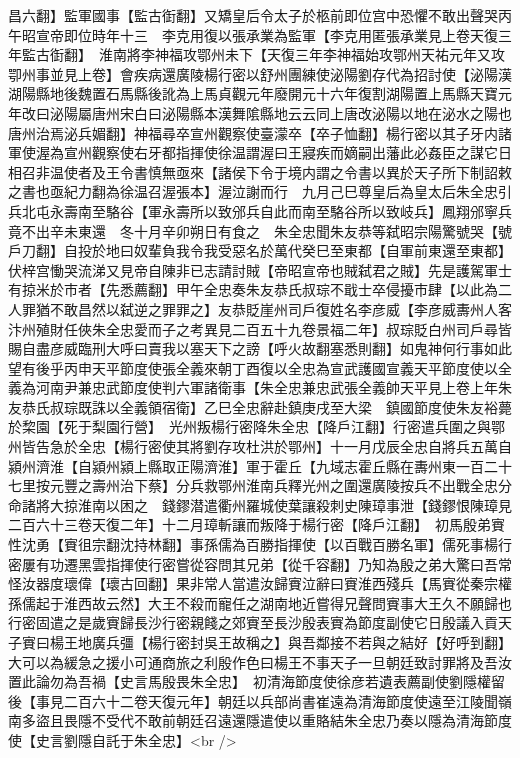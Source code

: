 昌六翻】監軍國事【監古衘翻】又矯皇后令太子於柩前即位宫中恐懼不敢出聲哭丙午昭宣帝即位時年十三　李克用復以張承業為監軍【李克用匿張承業見上卷天復三年監古衘翻】　淮南將李神福攻鄂州未下【天復三年李神福始攻鄂州天祐元年又攻卾州事並見上卷】會疾病還廣陵楊行密以舒州團練使泌陽劉存代為招討使【泌陽漢湖陽縣地後魏置石馬縣後訛為上馬貞觀元年廢開元十六年復割湖陽置上馬縣天寶元年改曰泌陽屬唐州宋白曰泌陽縣本漢舞隂縣地云云同上唐改泌陽以地在泌水之陽也唐州治焉泌兵媚翻】神福尋卒宣州觀察使臺濛卒【卒子恤翻】楊行密以其子牙内諸軍使渥為宣州觀察使右牙都指揮使徐温謂渥曰王寢疾而嫡嗣出藩此必姦臣之謀它日相召非温使者及王令書慎無亟來【諸侯下令于境内謂之令書以異於天子所下制詔敕之書也亟紀力翻為徐温召渥張本】渥泣謝而行　九月己巳尊皇后為皇太后朱全忠引兵北屯永壽南至駱谷【軍永壽所以致邠兵自此而南至駱谷所以致岐兵】鳳翔邠寧兵竟不出辛未東還　冬十月辛卯朔日有食之　朱全忠聞朱友恭等弑昭宗陽驚號哭【號戶刀翻】自投於地曰奴輩負我令我受惡名於萬代癸巳至東都【自軍前東還至東都】伏梓宫慟哭流涕又見帝自陳非已志請討賊【帝昭宣帝也賊弑君之賊】先是護駕軍士有掠米於市者【先悉薦翻】甲午全忠奏朱友恭氏叔琮不戢士卒侵擾市肆【以此為二人罪猶不敢昌然以弑逆之罪罪之】友恭貶崖州司戶復姓名李彦威【李彦威夀州人客汴州殖財任俠朱全忠愛而子之考異見二百五十九卷景福二年】叔琮貶白州司戶尋皆賜自盡彦威臨刑大呼曰賣我以塞天下之謗【呼火故翻塞悉則翻】如鬼神何行事如此望有後乎丙申天平節度使張全義來朝丁酉復以全忠為宣武護國宣義天平節度使以全義為河南尹兼忠武節度使判六軍諸衛事【朱全忠兼忠武張全義帥天平見上卷上年朱友恭氏叔琮既誅以全義領宿衛】乙巳全忠辭赴鎮庚戌至大梁　鎮國節度使朱友裕薨於棃園【死于梨園行營】　光州叛楊行密降朱全忠【降戶江翻】行密遣兵圍之與鄂州皆告急於全忠【楊行密使其將劉存攻杜洪於鄂州】十一月戊辰全忠自將兵五萬自潁州濟淮【自潁州潁上縣取正陽濟淮】軍于霍丘【九域志霍丘縣在夀州東一百二十七里按元豐之壽州治下蔡】分兵救鄂州淮南兵釋光州之圍還廣陵按兵不出戰全忠分命諸將大掠淮南以困之　錢鏐潜遣衢州羅城使葉讓殺刺史陳璋事泄【錢鏐恨陳璋見二百六十三卷天復二年】十二月璋斬讓而叛降于楊行密【降戶江翻】　初馬殷弟賨性沈勇【賨徂宗翻沈持林翻】事孫儒為百勝指揮使【以百戰百勝名軍】儒死事楊行密屢有功遷黑雲指揮使行密嘗從容問其兄弟【從千容翻】乃知為殷之弟大驚曰吾常怪汝器度瓌偉【瓌古回翻】果非常人當遣汝歸賨泣辭曰賨淮西殘兵【馬賨從秦宗權孫儒起于淮西故云然】大王不殺而寵任之湖南地近嘗得兄聲問賨事大王久不願歸也行密固遣之是歲賨歸長沙行密親餞之郊賨至長沙殷表賨為節度副使它日殷議入貢天子賨曰楊王地廣兵彊【楊行密封吳王故稱之】與吾鄰接不若與之結好【好呼到翻】大可以為緩急之援小可通商旅之利殷作色曰楊王不事天子一旦朝廷致討罪將及吾汝置此論勿為吾禍【史言馬殷畏朱全忠】　初清海節度使徐彦若遺表薦副使劉隱權留後【事見二百六十二卷天復元年】朝廷以兵部尚書崔遠為清海節度使遠至江陵聞嶺南多盜且畏隱不受代不敢前朝廷召遠還隱遣使以重賂結朱全忠乃奏以隱為清海節度使【史言劉隱自託于朱全忠】<br />
